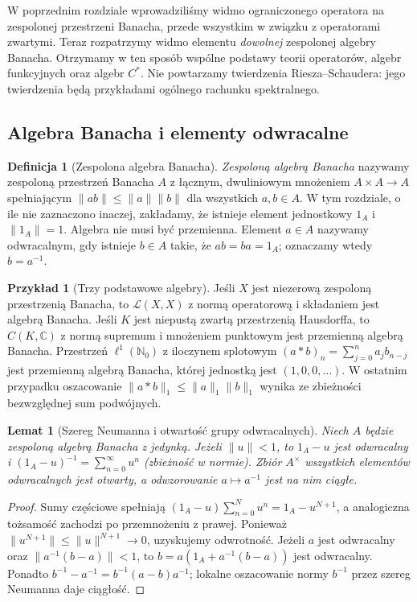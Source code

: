 \documentclass[11pt,a4paper]{article}
\numberwithin{equation}{section}
\theoremstyle{plain}
\newtheorem{lemat}[twierdzenie]{Lemat}
\theoremstyle{definition}
\newtheorem{definicja}[twierdzenie]{Definicja}
\newtheorem{przyklad}[twierdzenie]{Przykład}
\theoremstyle{remark}
\newcommand{\C}{\mathbb C}
\newcommand{\N}{\mathbb N}
\begin{document}
W poprzednim rozdziale wprowadziliśmy widmo ograniczonego operatora
na zespolonej przestrzeni Banacha, przede wszystkim w związku z operatorami
zwartymi. Teraz rozpatrzymy widmo elementu \emph{dowolnej} zespolonej algebry
Banacha. Otrzymamy w ten sposób wspólne podstawy teorii operatorów, algebr
funkcyjnych oraz algebr $C^*$. Nie powtarzamy twierdzenia Riesza--Schaudera:
jego twierdzenia będą przykładami ogólnego rachunku spektralnego.

\subsection{Algebra Banacha i elementy odwracalne}

\begin{definicja}[Zespolona algebra Banacha]
\label{def:banach-algebra31}
\emph{Zespoloną algebrą Banacha} nazywamy zespoloną przestrzeń Banacha
$A$ z łącznym, dwuliniowym mnożeniem $A\times A\to A$ spełniającym
$\|ab\|\le\|a\|\|b\|$ dla wszystkich $a,b\in A$.
W tym rozdziale, o ile nie zaznaczono inaczej, zakładamy, że istnieje
element jednostkowy $1_A$ i $\|1_A\|=1$. Algebra nie musi być przemienna.
Element $a\in A$ nazywamy odwracalnym, gdy istnieje $b\in A$ takie,
że $ab=ba=1_A$; oznaczamy wtedy $b=a^{-1}$.
\end{definicja}

\begin{przyklad}[Trzy podstawowe algebry]
\label{ex:banach-algebras31}
Jeśli $X$ jest niezerową zespoloną przestrzenią Banacha, to $\mathcal L(X,X)$
z normą operatorową i składaniem jest algebrą Banacha.
Jeśli $K$ jest niepustą zwartą przestrzenią Hausdorffa, to $C(K,\C)$
z normą supremum i mnożeniem punktowym jest przemienną algebrą Banacha.
Przestrzeń $\ell^1(\N_0)$ z iloczynem splotowym
$(a*b)_n=\sum_{j=0}^n a_jb_{n-j}$ jest przemienną algebrą Banacha,
której jednostką jest $(1,0,0,\ldots)$.
W ostatnim przypadku oszacowanie $\|a*b\|_1\le\|a\|_1\|b\|_1$
wynika ze zbieżności bezwzględnej sum podwójnych.
\end{przyklad}

\begin{lemat}[Szereg Neumanna i otwartość grupy odwracalnych]
\label{lem:neumann31}
Niech $A$ będzie zespoloną algebrą Banacha z jedynką.
Jeżeli $\|u\|<1$, to $1_A-u$ jest odwracalny i
$(1_A-u)^{-1}=\sum_{n=0}^\infty u^n$ (zbieżność w normie).
Zbiór $A^\times$ wszystkich elementów odwracalnych jest otwarty,
a odwzorowanie $a\mapsto a^{-1}$ jest na nim ciągłe.
\end{lemat}
\begin{proof}
Sumy częściowe spełniają
$(1_A-u)\sum_{n=0}^N u^n=1_A-u^{N+1}$,
a analogiczna tożsamość zachodzi po przemnożeniu z prawej.
Ponieważ $\|u^{N+1}\|\le\|u\|^{N+1}\to0$, uzyskujemy odwrotność.
Jeżeli $a$ jest odwracalny oraz $\|a^{-1}(b-a)\|<1$, to
$b=a(1_A+a^{-1}(b-a))$ jest odwracalny. Ponadto
$b^{-1}-a^{-1}=b^{-1}(a-b)a^{-1}$; lokalne oszacowanie
normy $b^{-1}$ przez szereg Neumanna daje ciągłość.
\end{proof}
\end{document}
